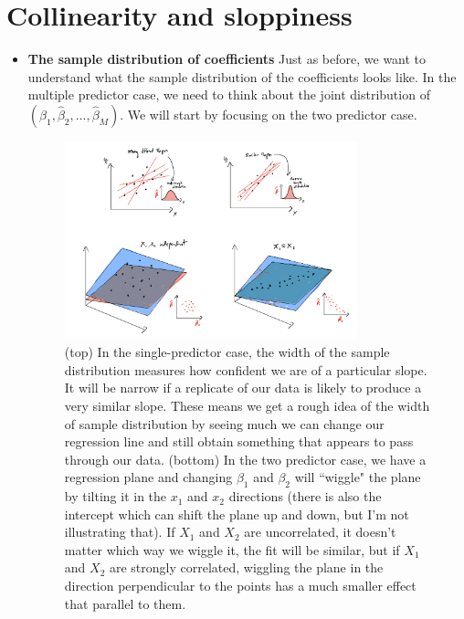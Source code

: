 \section{Collinearity and sloppiness}
\begin{itemize}
\item {\bf The sample distribution of coefficients}
Just as before, we want to understand what the sample distribution of the coefficients looks like. In the multiple predictor case, we need to think about the joint distribution  of $(\hat{\beta}_1,\hat{\beta}_2,\dots,\hat{\beta}_M)$. We will start by focusing on the two predictor case.  



\begin{figure}[h]
    \centering
    \includegraphics[width=0.8\textwidth]{./../figures/sample_dist}
    \caption{(top) In the single-predictor case, the width of the sample distribution measures how confident we are of a particular slope. It will be narrow if a replicate of our data is likely to produce a very similar slope.  These means we get a rough idea of the width of sample distribution by seeing much we can change our regression line and still obtain something that appears to pass through our data. (bottom) In the two predictor case, we have a regression plane and changing $\beta_1$ and $\beta_2$ will ``wiggle" the plane by tilting it in the $x_1$ and $x_2$ directions (there is also the intercept which can shift the plane up and down, but I'm not illustrating that). If $X_1$ and $X_2$ are uncorrelated, it doesn't matter which way we wiggle it, the fit will be similar, but if $X_1$ and $X_2$ are strongly correlated, wiggling the plane in the direction perpendicular  to the points has a much smaller effect that parallel to them. }
    \label{fig:sample_dist}
\end{figure}




\end{itemize}
